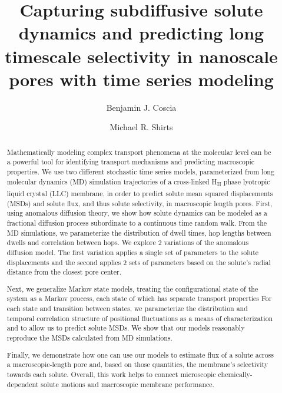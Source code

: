 \documentclass{article}
\title{Capturing subdiffusive solute dynamics and predicting long timescale selectivity in nanoscale pores
with time series modeling}
\author{Benjamin J. Coscia \and Michael R. Shirts}
\begin{document}
  \graphicspath{{./figures/}}
  \maketitle
  
  \begin{abstract}
  Mathematically modeling complex transport phenomena at the molecular level 
  can be a powerful tool for identifying transport mechanisms and predicting
  macroscopic properties. We use two different stochastic time series models,
  parameterized from long molecular dynamics (MD) simulation trajectories of
  a cross-linked H\textsubscript{II} phase lyotropic liquid crystal (LLC) 
  membrane, in order to predict solute mean squared displacements (MSDs) 
  and solute flux,
  and thus solute selectivity, 
  in macroscopic length pores. 
  First, using
  anomalous diffusion theory, we show how solute dynamics can be modeled 
  as a fractional diffusion process subordinate to a continuous time random 
  walk. From the MD simulations, we parameterize the distribution of 
  dwell times, hop lengths between dwells and correlation between hops. We 
  explore 2 variations of the anomalous diffusion model. The first variation
  applies a single set of parameters to the solute displacements and the second
  applies 2 sets of parameters based on the solute's radial distance from the
  closest pore center. 

  Next, we generalize Markov state models,
  treating the configurational state of the system as a Markov process, each 
  state of which has separate transport properties
  For each state and transition
  between states, we parameterize the distribution and temporal correlation 
  structure of positional fluctuations as a means of characterization and to 
  allow us to predict solute MSDs. We show that our models reasonably reproduce
  the MSDs calculated from MD simulations. 

  Finally, we demonstrate how one can
  use our models 
  to estimate
  flux of a 
  solute across a 
  macroscopic-length pore and, based on those quantities, the membrane's selectivity
  towards each solute. Overall, this work helps to connect 
  microscopic chemically-dependent solute motions and macroscopic membrane performance.

  \end{abstract}
\end{document}
